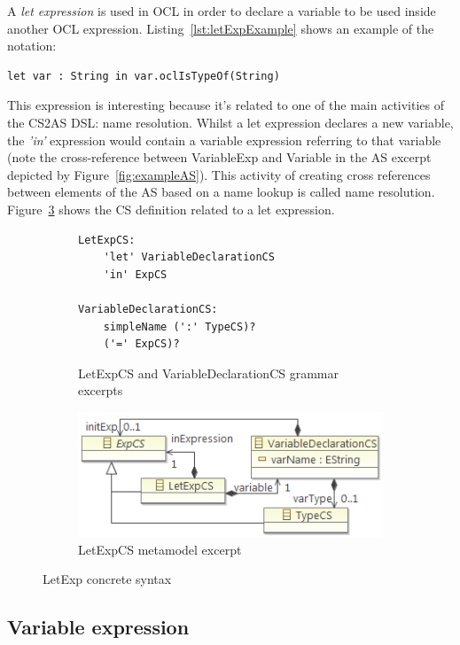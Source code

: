 \documentclass{llncs}
\begin{document}
A \textit{let expression} is used in OCL in order to declare a variable to be used inside another OCL expression. Listing~\ref{lst:letExpExample} shows an example of the notation:

\begin{lstlisting}[label=lst:letExpExample, language=OCL]
let var : String in var.oclIsTypeOf(String)
\end{lstlisting}

This expression is interesting because it's related to one of the main activities of the CS2AS DSL: name resolution. Whilst a let expression declares a new variable, the \emph{'in'} expression would contain a variable expression referring to that variable (note the cross-reference between VariableExp and Variable in the AS excerpt depicted by Figure~\ref{fig:exampleAS}). This activity of creating cross references between elements of the AS based on a name lookup is called name resolution. Figure~\ref{fig:LetExpCS} shows the CS definition related to a let expression.

\begin{figure}[htbp]
\centering
\begin{subfigure}{0.5\textwidth}
  \centering
  \begin{lstlisting}[label=lst:letExpEBNF, language=Xtext]
LetExpCS:
    'let' VariableDeclarationCS 
  	'in' ExpCS
  	
VariableDeclarationCS:
    simpleName (':' TypeCS)?
    ('=' ExpCS)?	
  \end{lstlisting} 
  \caption{LetExpCS and VariableDeclarationCS grammar excerpts}
  \label{fig:LetExpCS:a}
\end{subfigure}%
\begin{subfigure}{0.5\textwidth}
  \centering
  \includegraphics[scale=0.75]{images/LetExpCS.png}
  \caption{LetExpCS metamodel excerpt}
  \label{fig:LetExpCS:b}
\end{subfigure}
\caption{LetExp concrete syntax}
\label{fig:LetExpCS}
\end{figure}

\subsection{Variable expression}
\end{document}
